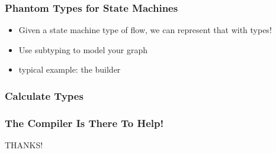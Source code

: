 \documentclass{beamer}
\begin{document}
\begin{frame}
  \frametitle{Phantom Types for State Machines}
  \begin{itemize}
  \item Given a state machine type of flow, we can represent that with
    types!
  \item Use subtyping to model your graph
  \item typical example: the builder
  \end{itemize}
\end{frame}

\begin{frame}
  \frametitle{Calculate Types}
  
\end{frame}

\begin{frame}
  \frametitle{The Compiler Is There To Help!}
  \vfill
  \begin{center}
    {\Huge THANKS!}
  \end{center}
\end{frame}
\end{document}
